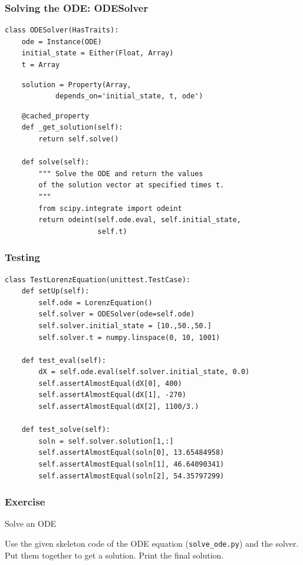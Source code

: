 \documentclass[14pt,compress]{beamer}
\newcounter{time}
\newcommand{\typ}[1]{\lstinline{#1}}
\begin{document}
\begin{frame}
\frametitle{Solving the ODE: ODESolver}
\footnotesize
\begin{lstlisting}
class ODESolver(HasTraits):
    ode = Instance(ODE)
    initial_state = Either(Float, Array)
    t = Array
\end{lstlisting}
\pause
\begin{lstlisting}
    solution = Property(Array, 
            depends_on='initial_state, t, ode')
\end{lstlisting}
\pause
\begin{lstlisting}
    @cached_property
    def _get_solution(self):
        return self.solve()

    def solve(self):
        """ Solve the ODE and return the values 
        of the solution vector at specified times t. 
        """
        from scipy.integrate import odeint
        return odeint(self.ode.eval, self.initial_state, 
                      self.t)
\end{lstlisting}
\end{frame}

\begin{frame}
\frametitle{Testing}
\footnotesize
\begin{lstlisting}
class TestLorenzEquation(unittest.TestCase):
    def setUp(self):
        self.ode = LorenzEquation()
        self.solver = ODESolver(ode=self.ode)
        self.solver.initial_state = [10.,50.,50.]
        self.solver.t = numpy.linspace(0, 10, 1001)

    def test_eval(self):
        dX = self.ode.eval(self.solver.initial_state, 0.0)
        self.assertAlmostEqual(dX[0], 400)
        self.assertAlmostEqual(dX[1], -270)
        self.assertAlmostEqual(dX[2], 1100/3.)

    def test_solve(self):
        soln = self.solver.solution[1,:]
        self.assertAlmostEqual(soln[0], 13.65484958)
        self.assertAlmostEqual(soln[1], 46.64090341)
        self.assertAlmostEqual(soln[2], 54.35797299)
\end{lstlisting}
\end{frame}

\begin{frame}[plain]
    \frametitle{Exercise}
  \begin{block}{Solve an ODE}

      Use the given skeleton code of the ODE equation (\typ{solve_ode.py}) and
      the solver. Put them together to get a solution.  Print the final
      solution.
      
  \end{block}  
\end{frame}
\end{document}
